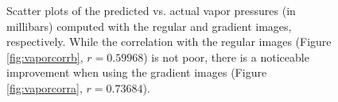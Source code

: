 \begin{figure}
	\centering
	\caption{Scatter plots of the predicted vs. actual vapor pressures (in millibars) computed with the regular and gradient images, respectively. While the correlation with the regular images (Figure \ref{fig:vaporcorrb}, $r=0.59968$) is not poor, there is a noticeable improvement when using the gradient images (Figure \ref{fig:vaporcorra}, $r=0.73684$).}
	\label{fig:vaporcorr}
\end{figure}

